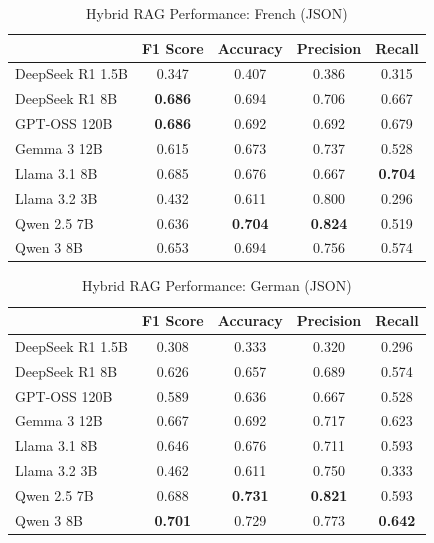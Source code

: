 \begin{table}[!htbp]
\caption{Hybrid RAG Performance: French (JSON)}
\label{tab:hybrid_french_json}
\begin{tabular}{lcccc}
\toprule
 & F1 Score & Accuracy & Precision & Recall \\
\midrule
DeepSeek R1 1.5B & 0.347 & 0.407 & 0.386 & 0.315 \\
DeepSeek R1 8B & \textbf{0.686} & 0.694 & 0.706 & 0.667 \\
GPT-OSS 120B & \textbf{0.686} & 0.692 & 0.692 & 0.679 \\
Gemma 3 12B & 0.615 & 0.673 & 0.737 & 0.528 \\
Llama 3.1 8B & 0.685 & 0.676 & 0.667 & \textbf{0.704} \\
Llama 3.2 3B & 0.432 & 0.611 & 0.800 & 0.296 \\
Qwen 2.5 7B & 0.636 & \textbf{0.704} & \textbf{0.824} & 0.519 \\
Qwen 3 8B & 0.653 & 0.694 & 0.756 & 0.574 \\
\bottomrule
\end{tabular}
\end{table}


\begin{table}[!htbp]
\caption{Hybrid RAG Performance: German (JSON)}
\label{tab:hybrid_german_json}
\begin{tabular}{lcccc}
\toprule
 & F1 Score & Accuracy & Precision & Recall \\
\midrule
DeepSeek R1 1.5B & 0.308 & 0.333 & 0.320 & 0.296 \\
DeepSeek R1 8B & 0.626 & 0.657 & 0.689 & 0.574 \\
GPT-OSS 120B & 0.589 & 0.636 & 0.667 & 0.528 \\
Gemma 3 12B & 0.667 & 0.692 & 0.717 & 0.623 \\
Llama 3.1 8B & 0.646 & 0.676 & 0.711 & 0.593 \\
Llama 3.2 3B & 0.462 & 0.611 & 0.750 & 0.333 \\
Qwen 2.5 7B & 0.688 & \textbf{0.731} & \textbf{0.821} & 0.593 \\
Qwen 3 8B & \textbf{0.701} & 0.729 & 0.773 & \textbf{0.642} \\
\bottomrule
\end{tabular}
\end{table}


